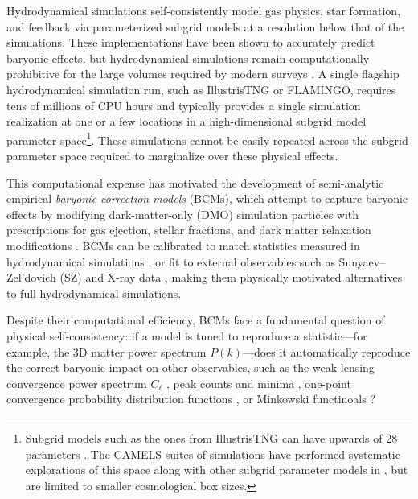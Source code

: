 \documentclass[linenumbers,trackchanges]{aastex701}
\begin{document}
Hydrodynamical simulations self-consistently model gas physics, star formation, and feedback via parameterized subgrid models at a resolution below that of the simulations. These implementations have been shown to accurately predict baryonic effects, but hydrodynamical simulations remain computationally prohibitive for the large volumes required by modern surveys \citep{schaye10, Pillepich17, Nelson2019}. A single flagship hydrodynamical simulation run, such as IllustrisTNG or FLAMINGO, requires tens of millions of CPU hours \citep{Nelson2019, Flamingo-23} and typically provides a single simulation realization at one or a few locations in a high-dimensional subgrid model parameter space\footnote{Subgrid models such as the ones from IllustrisTNG can have upwards of 28 parameters \citep{Ni2023}. The CAMELS suites of simulations have performed systematic explorations of this space along with other subgrid parameter models in \citep{camels20, Ni2023}, but are limited to smaller cosmological box sizes.}. These simulations cannot be easily repeated across the subgrid parameter space required to marginalize over these physical effects.

This computational expense has motivated the development of semi-analytic empirical \emph{baryonic correction models} (BCMs), which attempt to capture baryonic effects by modifying dark-matter-only (DMO) simulation particles with prescriptions for gas ejection, stellar fractions, and dark matter relaxation modifications \citep{Schneider-15, Schneider19, Arico2020, Arico20b, Anbajagane-24, Schneider-25}. BCMs can be calibrated to match statistics measured in hydrodynamical simulations \citep{Arico+2021,Zhou25}, or fit to external observables such as Sunyaev–Zel’dovich (SZ) and X-ray data \citep{Schneider19, Schneider-25, Grandis-24}, making them physically motivated alternatives to full hydrodynamical simulations.

Despite their computational efficiency, BCMs face a fundamental question of physical self-consistency: if a model is tuned to reproduce a statistic—for example, the 3D matter power spectrum $P(k)$—does it automatically reproduce the correct baryonic impact on other observables, such as the weak lensing convergence power spectrum $C_\ell$ \citep{heymans13, kitching14, hildebrandt17, Hikage19}, peak counts and minima \citep{jain00, yang11, Liu15, kacprzak16, Li2019, Martinet2021, Zurcher2021, Harnois2021}, one-point convergence probability distribution functions \citep{thiele_accurate_2020}, or Minkowski functinoals \citep{Maturi+2010,Munshi11, Kratochvil+2012, petri13, Marques2019, Gatti21}?
\end{document}
